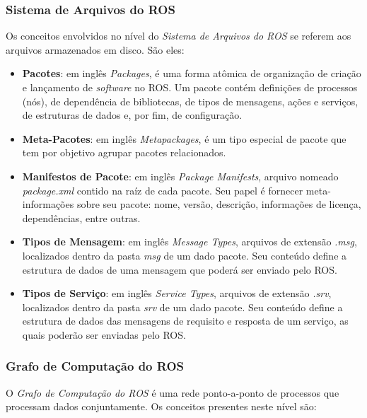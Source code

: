             \subsubsection{Sistema de Arquivos do ROS} \label{subsubsec:ros_arquivos}
                Os conceitos envolvidos no nível do \textit{Sistema de Arquivos do ROS} se referem aos arquivos armazenados em disco. São eles:
                
                \begin{itemize}
                    \item \textbf{Pacotes}: em inglês \textit{Packages}, é uma forma atômica de organização de criação e lançamento de \textit{software} no ROS. Um pacote contém definições de processos (nós), de dependência de bibliotecas, de tipos de mensagens, ações e serviços, de estruturas de dados e, por fim, de configuração. 
                    
                    \item \textbf{Meta-Pacotes}: em inglês \textit{Metapackages}, é um tipo especial de pacote que tem por objetivo agrupar pacotes relacionados.
                    
                    \item \textbf{Manifestos de Pacote}: em inglês \textit{Package Manifests}, arquivo nomeado \textit{package.xml} contido na raíz de cada pacote. Seu papel é fornecer meta-informações sobre seu pacote: nome, versão, descrição, informações de licença, dependências, entre outras. 
                    
                    \item \textbf{Tipos de Mensagem}: em inglês \textit{Message Types}, arquivos de extensão \textit{.msg}, localizados dentro da pasta \textit{msg} de um dado pacote. Seu conteúdo define a estrutura de dados de uma mensagem que poderá ser enviado pelo ROS.
                    
                    \item \textbf{Tipos de Serviço}: em inglês \textit{Service Types}, arquivos de extensão \textit{.srv}, localizados dentro da pasta \textit{srv} de um dado pacote. Seu conteúdo define a estrutura de dados das mensagens de requisito e resposta de um serviço, as quais poderão ser enviadas pelo ROS.
                \end{itemize}
            
            \subsubsection{Grafo de Computação do ROS} \label{subsubsec:ros_grafo}
                O \textit{Grafo de Computação do ROS} é uma rede ponto-a-ponto de processos que processam dados conjuntamente. Os conceitos presentes neste nível são:
                
